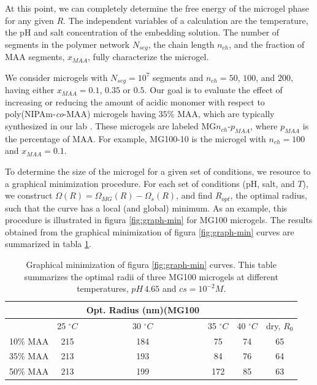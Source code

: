 At this point, we can completely determine the free energy of the microgel phase for any given $R$.
The independent variables of a calculation are the temperature, the pH and salt concentration of the embedding solution.
The number of segments in the polymer network $N_{seg}$, the chain length $n_{ch}$, and the fraction of MAA segments, $x_{MAA}$, fully characterize the microgel.


We consider microgels with $N_{seg}=10^7$ segments and $n_{ch}=50$, $100$, and $200$, having either $x_{MAA}=0.1$, $0.35$ or $0.5$.
Our goal is to evaluate the effect of increasing or reducing the amount of acidic monomer with respect to poly(NIPAm-\emph{co}-MAA) microgels having $35\%$ MAA, which are typically synthesized in our lab .
These microgels are labeled MG$n_{ch}$-$p_{MAA}$, where $p_{MAA}$ is the percentage of MAA.
For example, MG100-10 is the microgel with  $n_{ch}=100$ and $x_{MAA}=0.1$.






To determine the size of the microgel for a given set of conditions, we resource to a graphical minimization procedure.
For each set of conditions (pH, salt, and $T$), we construct $\Omega(R)=\Omega_{MG}(R)-\Omega_{s}(R)$, and find $R_{opt}$, the optimal radius, such that the curve has a local (and global) minimum.
As an example, this procedure is illustrated in figura \ref{fig:graph-min} for MG100 microgels.
The results obtained from the graphical minimization of figura \ref{fig:graph-min} curves are summarized in tabla \ref{table:optimal-R}.



\begin{table}[!htb]
\centering
\small
  \begin{tabular}{|lccccc|}
   \hline %
    	&&   Opt. Radius (nm)(MG100 & && \\
    	\hline
      & {25 $^\circ C$} & {30 $^\circ C$} & {35 $^\circ C$} & {40 $^\circ C$} & {dry, $R_0$} \\
      \hline
    10\% MAA & 215 &  184 &  75  &  74 & 65\\
    35\% MAA &  213 &  193 &  84 & 76 & 64\\
    50\% MAA &  213 & 199 &  172 & 85 & 63\\
    \hline
  \end{tabular}
 \caption{Graphical minimization of figura \ref{fig:graph-min} curves.
 This table summarizes the optimal radii of three MG100 microgels at different temperatures, $pH\,4.65$ and $cs=10^{-2}M$.}
\label{table:optimal-R} 
\end{table}



